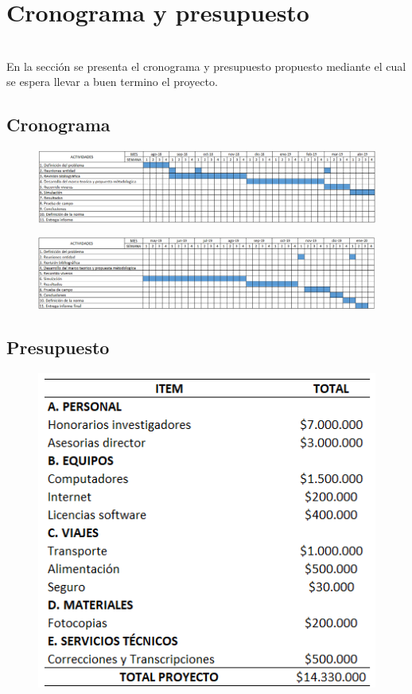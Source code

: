 \chapter{Cronograma y presupuesto}
~\\En la secci\'{o}n se presenta el cronograma y presupuesto propuesto mediante el cual se espera llevar a buen termino el proyecto.

\section{Cronograma}
\begin{figure}[!h]
\centering
        \includegraphics[scale=0.53]{IMAGENES/CR1.png}
        \label{figura1}
\end{figure}
\begin{figure}[!h]
\centering
        \includegraphics[scale=0.53]{IMAGENES/CR2.png}
        \label{figura1}
\end{figure}

\pagebreak
\section{Presupuesto}
\begin{figure}[!h]
\centering
        \includegraphics[scale=1]{IMAGENES/PR.png}
        \label{figura1}
\end{figure}
